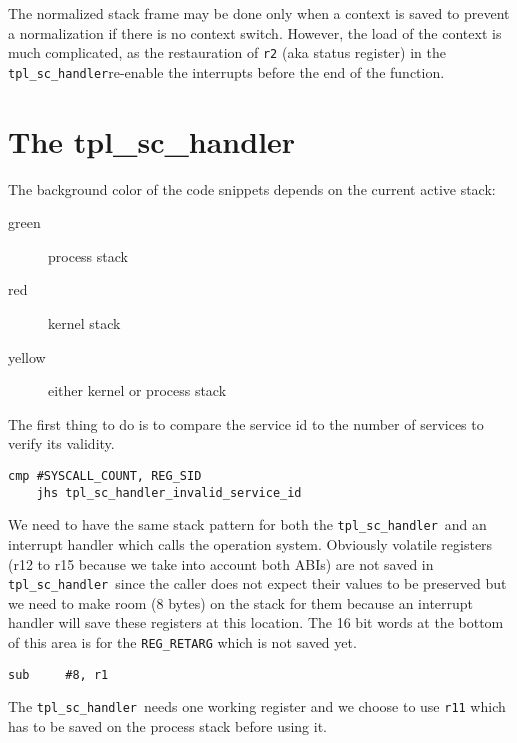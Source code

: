 \documentclass[11pt, oneside]{article}   	%
\newcommand{\sch}{\lstinline{tpl_sc_handler}}
\begin{document}
The normalized stack frame may be done only when a context is saved to prevent a normalization if there is no context switch. However, the load of the context is much complicated, as the restauration of \texttt{r2} (aka status register) in the \sch re-enable the interrupts before the end of the function.

\section{The tpl\_sc\_handler}

The background color of the code snippets depends on the current active stack:
\begin{description}
	\item[green] process stack
	\item[red]   kernel stack
	\item[yellow] either kernel or process stack
\end{description}


\vspace{1em}

The first thing to do is to compare the service id to the number of services to verify its validity.

\begin{lstlisting}[backgroundcolor=\color{yellow!15}]
    cmp #SYSCALL_COUNT, REG_SID
    jhs tpl_sc_handler_invalid_service_id
\end{lstlisting}

We need to have the same stack pattern for both the \sch\ and an interrupt handler which calls the operation system. Obviously volatile registers (r12 to r15 because we take into account both ABIs) are not saved in \sch\ since the caller does not expect their values to be preserved but we need to make room (8 bytes) on the stack for them because an interrupt handler will save these registers at this location. The 16 bit words at the bottom of this area is for the \lstinline{REG_RETARG} which is not saved yet.

\begin{lstlisting}[backgroundcolor=\color{yellow!15}]
    sub     #8, r1
\end{lstlisting}

The \sch\ needs one working register and we choose to use \lstinline{r11} which has to be saved on the process stack before using it.
\end{document}
